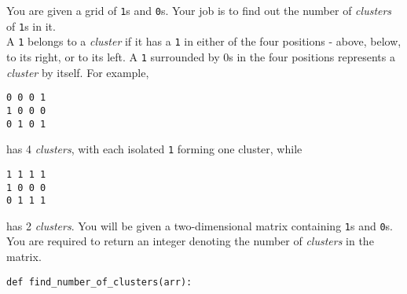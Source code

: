 \question
You are given a grid of \texttt{1}s and \texttt{0}s. Your job is to find out the number of \textit{clusters} of \texttt{1}s in it.\\
A \texttt{1} belongs to a \textit{cluster} if it has a \texttt{1} in either of the four positions - above, below, to its right, or to its left.
A \texttt{1} surrounded by 0s in the four positions represents a \textit{cluster} by itself.
For example, 
\begin{Verbatim}
0 0 0 1
1 0 0 0
0 1 0 1
\end{Verbatim}
has 4 \textit{clusters}, with each isolated \texttt{1} forming one cluster, while 
\begin{Verbatim}
1 1 1 1
1 0 0 0
0 1 1 1
\end{Verbatim}
has 2 \textit{clusters}.
\newline \newline
You will be given a two-dimensional matrix containing \texttt{1}s and \texttt{0}s. You are required to return an integer denoting the number of \textit{clusters} in the matrix.
\newline
\begin{Verbatim}
def find_number_of_clusters(arr):
	
\end{Verbatim}


